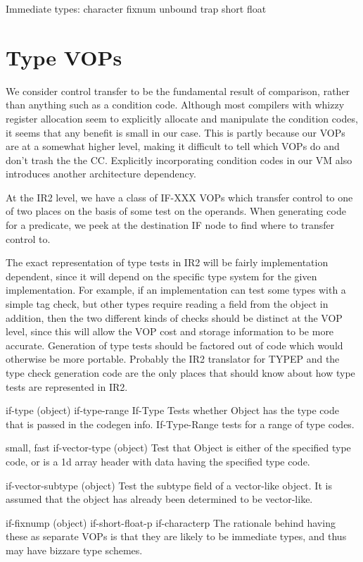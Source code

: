 Immediate types:
  character
  fixnum
  unbound trap
  short float



\section{Type VOPs}

We consider control transfer to be the fundamental result of comparison, rather
than anything such as a condition code.  Although most compilers with whizzy
register allocation seem to explicitly allocate and manipulate the condition
codes, it seems that any benefit is small in our case.  This is partly because
our VOPs are at a somewhat higher level, making it difficult to tell which VOPs
do and don't trash the the CC.  Explicitly incorporating condition codes in our
VM also introduces another architecture dependency.

At the IR2 level, we have a class of IF-XXX VOPs which transfer control to one
of two places on the basis of some test on the operands.  When generating code
for a predicate, we peek at the destination IF node to find where to transfer
control to.
			
The exact representation of type tests in IR2 will be fairly implementation
dependent, since it will depend on the specific type system for the given
implementation.  For example, if an implementation can test some types with a
simple tag check, but other types require reading a field from the object in
addition, then the two different kinds of checks should be distinct at the VOP
level, since this will allow the VOP cost and storage information to be more
accurate.  Generation of type tests should be factored out of code which would
otherwise be more portable.  Probably the IR2 translator for TYPEP and the type
check generation code are the only places that should know about how type tests
are represented in IR2.

if-type (object)
if-type-range
    If-Type Tests whether Object has the type code that is passed in the
    codegen info.  If-Type-Range tests for a range of type codes.

{small, fast} if-vector-type (object)
    Test that Object is either of the specified type code, or is a 1d array
    header with data having the specified type code.

if-vector-subtype (object)
    Test the subtype field of a vector-like object.  It is assumed that the
    object has already been determined to be vector-like.

if-fixnump (object)
if-short-float-p
if-characterp
    The rationale behind having these as separate VOPs is that they are likely
    to be immediate types, and thus may have bizzare type schemes.

